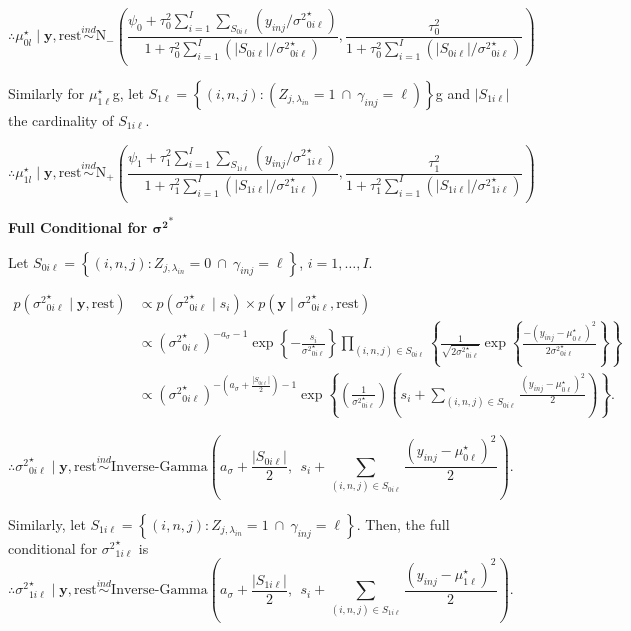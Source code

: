 \documentclass[12pt,]{article}
\newcommand{\p}[1]{\left(#1\right)}
\newcommand{\bc}[1]{ \left\{#1\right\} }
\newcommand{\abs}[1]{ \left|#1\right| }
\newcommand{\N}{ \mathcal{N} }
\newcommand{\ind}{\overset{ind}{\sim}}
\def\N{\text{N}}
\def\IG{\text{Inverse-Gamma}}
\def\lin{\lambda_{in}}
\def\y{\bm{y}}
\def\mus{\mu^\star}
\def\sss{{\sigma^2}^\star}
\def\rest{\text{rest}}
\begin{document}
\[
\renewcommand\musZeroPostvarDenom{
  1 + \tau^2_0\sum_{i=1}^I(|S_{0i\ell}|/{\sigma^2}^\star_{0i\ell})
}
\renewcommand\musZeroPostMeanNum{
  \psi_0 + \tau^2_0 \sum_{i=1}^I\sum_{S_{0i\ell}} (y_{inj} /
  {\sigma^2}^\star_{0i\ell})
}
\therefore \mus_{0l} \mid \y, \rest \ind \N_-\p{
  \frac{\musZeroPostMeanNum}{\musZeroPostvarDenom},
  \frac{\tau^2_0}{\musZeroPostvarDenom}
}
\]

Similarly for \(\mus_{1\ell}\)g, let
\(S_{1\ell} = \bc{(i,n,j) : \p{Z_{j,\lin} = 1 ~\cap~ \gamma_{inj} = \ell}}\)g
and \(|S_{1i\ell}|\) the cardinality of \(S_{1i\ell}\).

\[
\newcommand\musOnePostvarDenom{
  1 + \tau^2_1 \sum_{i=1}^I (|S_{1i\ell}|/{\sigma^2}^\star_{1i\ell})
}
\newcommand\musOnePostMeanNum{
  \psi_1 + \tau^2_1 \sum_{i=1}^I \sum_{S_{1i\ell}} (y_{inj} /
  {\sigma^2}^\star_{1i\ell})
}
\therefore \mus_{1l} \mid \y, \rest \ind \N_+\p{
  \frac{\musOnePostMeanNum}{\musOnePostvarDenom},
  \frac{\tau^2_1}{\musOnePostvarDenom}
}
\]
\vspace{2em}


\textbf{Full Conditional for $\bm{{\sigma^2}}^*$}

Let
\(S_{0i\ell} = \bc{(i, n,j): Z_{j,\lin} = 0 ~\cap~ \gamma_{inj}=\ell}\),
\(i=1, \ldots, I\).

\begin{align*}
p(\sss_{0i\ell} \mid \y, \rest) &\propto p(\sss_{0i\ell} \mid s_i) \times p(\y
  \mid \sss_{0i\ell}, \rest) \\
&\propto (\sss_{0i\ell})^{-a_\sigma-1} \exp\bc{-\frac{s_i}{\sss_{0i\ell}}} 
\prod_{(i,n,j)\in S_{0i\ell}} \bc{
  \frac{1}{\sqrt{2\sss_{0i\ell}}}
  \exp\bc{\frac{-(y_{inj}-\mus_{0\ell})^2}{2\sss_{0i\ell}}}
} \\
&\propto (\sss_{0i\ell})^{-(a_\sigma + \frac{\abs{S_{0i\ell}}}{2})-1}
\exp\bc{\p{\frac{1}{\sss_{0i\ell}}}\p{s_i + \sum_{(i,n,j)\in S_{0i\ell}}
\frac{(y_{inj}-\mus_{0\ell})^2}{2}
}}.
\end{align*}

\[
\therefore \sss_{0i\ell} \mid \y, \rest \ind
\IG\p{a_\sigma + \frac{\abs{S_{0i\ell}}}{2}, ~~ s_i + \sum_{(i,n,j)\in S_{0i\ell}}
\frac{(y_{inj}-\mus_{0\ell})^2}{2}
}.
\]

Similarly, let
\(S_{1i\ell} = \bc{(i, n,j): Z_{j,\lin} = 1 ~\cap~ \gamma_{inj}=\ell}\).
Then, the full conditional for \(\sss_{1i\ell}\) is \[
\therefore \sss_{1i\ell} \mid \y, \rest \ind
\IG\p{a_\sigma + \frac{\abs{S_{1i\ell}}}{2}, ~~ s_i + \sum_{(i,n,j)\in S_{1i\ell}}
\frac{(y_{inj}-\mus_{1\ell})^2}{2}
}.
\]
\vspace{2em}
\end{document}
